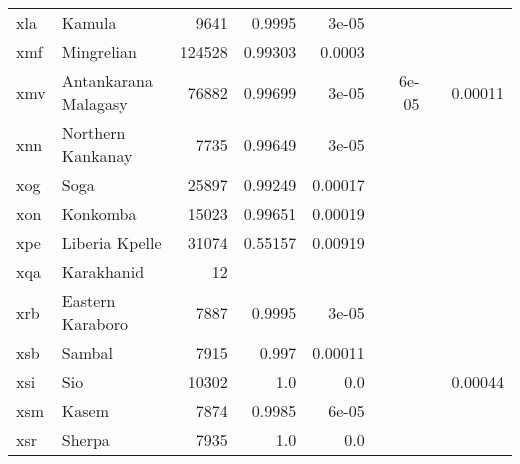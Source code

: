 \documentclass[11pt]{article}
\begin{document}
\begin{table*}[h]
{\begin{tabular}{llrrrrrrr}
xla         & Kamula         & 9641         & 0.9995         & 3e-05         &          &          &          &          \\

xmf         & Mingrelian         & 124528         & 0.99303         & 0.0003         &          &          &          &          \\

xmv         & Antankarana Malagasy         & 76882         & 0.99699         & 3e-05         &          & 6e-05         &          & 0.00011         \\

xnn         & Northern Kankanay         & 7735         & 0.99649         & 3e-05         &          &          &          &          \\

xog         & Soga         & 25897         & 0.99249         & 0.00017         &          &          &          &          \\

xon         & Konkomba         & 15023         & 0.99651         & 0.00019         &          &          &          &          \\

xpe         & Liberia Kpelle         & 31074         & 0.55157         & 0.00919         &          &          &          &          \\

xqa         & Karakhanid         & 12         &          &          &          &          &          &          \\

xrb         & Eastern Karaboro         & 7887         & 0.9995         & 3e-05         &          &          &          &          \\

xsb         & Sambal         & 7915         & 0.997         & 0.00011         &          &          &          &          \\

xsi         & Sio         & 10302         & 1.0         & 0.0         &          &          &          & 0.00044         \\

xsm         & Kasem         & 7874         & 0.9985         & 6e-05         &          &          &          &          \\

xsr         & Sherpa         & 7935         & 1.0         & 0.0         &          &          &          &          \\


\end{tabular}}
\end{table*}
\end{document}
